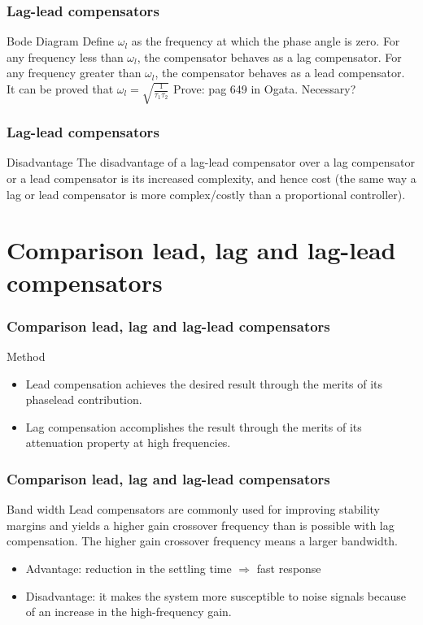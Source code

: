 \begin{frame}
\frametitle{Lag-lead compensators}
\begin{block}{Bode Diagram}
	Define $\omega_l$ as the frequency at which the phase angle is zero. For any frequency less than $\omega_l$, the compensator behaves as a lag compensator. For any frequency greater than $\omega_l$, the compensator behaves as a lead compensator. \\
	It can be proved that $\omega_l = \sqrt{\frac{1}{\tau_1 \tau_2}}$
	Prove: pag 649 in Ogata. Necessary?
\end{block}
\end{frame}

\begin{frame}
\frametitle{Lag-lead compensators}
\begin{block}{Disadvantage}
	The disadvantage of a lag-lead compensator over a lag compensator or a lead compensator is its increased complexity, and hence cost (the same way a lag or lead compensator is more complex/costly than a proportional controller).
\end{block}
\end{frame}

\section{Comparison lead, lag and lag-lead compensators}

\begin{frame}
\frametitle{Comparison lead, lag and lag-lead compensators}
\begin{block}{Method}
\begin{itemize}
\item Lead compensation achieves the desired result through the merits of its phaselead
contribution.
\item Lag compensation accomplishes the result through the merits of its attenuation property at high frequencies.
\end{itemize}
\end{block}
\end{frame}

\begin{frame}
\frametitle{Comparison lead, lag and lag-lead compensators}
\begin{block}{Band width}
Lead compensators are commonly used for improving stability margins and yields a higher gain crossover frequency than is possible with lag compensation. The higher gain crossover frequency means a larger bandwidth.
\begin{itemize}
\item Advantage: reduction in the settling time $\Rightarrow$ fast response
\item Disadvantage: it makes the system more susceptible to noise signals because of
an increase in the high-frequency gain. 
\end{itemize}
\end{block}
\end{frame}

